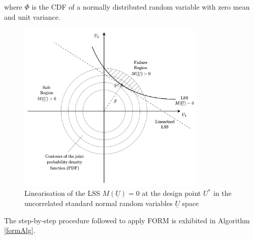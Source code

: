 where $\Phi$ is the \gls{CDF} of a normally distributed random variable with zero mean and unit variance.

\begin{figure}[H]
    \centering
    \includegraphics[width=0.8\textwidth]{Figures/FORM.png}
	\caption[Linearisation of the \gls{LSS} $M(\underline{U})=0$ at the design point $U^*$ in the uncorrelated standard normal random variables $\underline{U}$ space]{Linearisation of the \gls{LSS} $M(\underline{U})=0$ at the design point $U^*$ in the uncorrelated standard normal random variables $\underline{U}$ space \protect\footnotemark}
	\label{FORMgeom}
\end{figure}


\newpage

The step-by-step procedure followed to apply \gls{FORM} is exhibited in Algorithm \ref{formAlg}.\\

